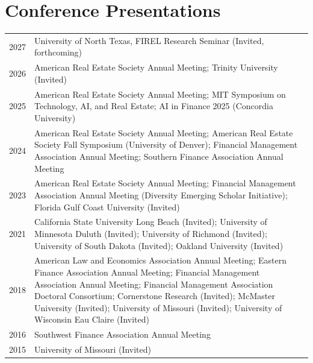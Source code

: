\documentclass[letterpaper,11pt]{article}
\newcommand{\sectionspacing}{\vspace{-2mm}}
\begin{document}
\section{\textbf{Conference Presentations}}
\vspace{1mm}
\small{
\begin{tabular*}{0.97\textwidth}[t]{@{}p{0.8cm}@{\hspace{4mm}}p{}@{}}
2027 & University of North Texas, FIREL Research Seminar (Invited, forthcoming) \\[2pt]
2026 & American Real Estate Society Annual Meeting; Trinity University (Invited) \\[2pt]
2025 & American Real Estate Society Annual Meeting; MIT Symposium on Technology, AI, and Real Estate; AI in Finance 2025 (Concordia University) \\[2pt]
2024 & American Real Estate Society Annual Meeting; American Real Estate Society Fall Symposium (University of Denver); Financial Management Association Annual Meeting; Southern Finance Association Annual Meeting \\[2pt]
2023 & American Real Estate Society Annual Meeting; Financial Management Association Annual Meeting (Diversity Emerging Scholar Initiative); Florida Gulf Coast University (Invited) \\[2pt]
2021 & California State University Long Beach (Invited); University of Minnesota Duluth (Invited); University of Richmond (Invited); University of South Dakota (Invited); Oakland University (Invited) \\[2pt]
2018 & American Law and Economics Association Annual Meeting; Eastern Finance Association Annual Meeting; Financial Management Association Annual Meeting; Financial Management Association Doctoral Consortium; Cornerstone Research (Invited); McMaster University (Invited); University of Missouri (Invited); University of Wisconsin Eau Claire (Invited) \\[2pt]
2016 & Southwest Finance Association Annual Meeting \\[2pt]
2015 & University of Missouri (Invited) \\
\end{tabular*}
}
\sectionspacing
\end{document}
